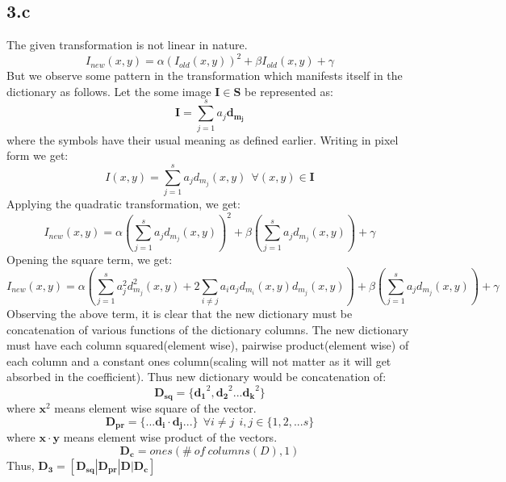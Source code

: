 \documentclass[12pt]{article}
\begin{document}
\subsection*{3.c}
The given transformation is not linear in nature.
\begin{equation*}
    I_{new}(x,y) = \alpha(I_{old}(x,y))^2+\beta I_{old}(x,y)+\gamma
\end{equation*}
But we observe some pattern in the transformation which manifests itself in the dictionary as follows. Let the some image $\boldsymbol{I}\in \boldsymbol{S}$ be represented as:
\begin{equation*}
    \boldsymbol{I} = \sum_{j=1}^{s} a_j\boldsymbol{d_{m_j}}  
\end{equation*}
where the symbols have their usual meaning as defined earlier. Writing in pixel form we get:
\begin{equation*}
    I(x,y) = \sum_{j=1}^{s} a_jd_{m_j}(x,y) \ \ \forall (x,y) \in \boldsymbol{I}
\end{equation*}
Applying the quadratic transformation, we get:
\begin{equation*}
    I_{new}(x,y) = \alpha(\sum_{j=1}^{s} a_jd_{m_j}(x,y))^2+\beta(\sum_{j=1}^{s} a_jd_{m_j}(x,y))+\gamma 
\end{equation*}
Opening the square term, we get:
\begin{equation*}
    I_{new}(x,y) = \alpha(\sum_{j=1}^{s} a_j^2d_{m_j}^2(x,y)+2\sum_{i\not= j}a_ia_jd_{m_i}(x,y)d_{m_j}(x,y))+\beta(\sum_{j=1}^{s} a_jd_{m_j}(x,y))+\gamma 
\end{equation*}
Observing the above term, it is clear that the new dictionary must be concatenation of various functions of the dictionary columns. The new dictionary must have each column squared(element wise), pairwise product(element wise) of each column and a constant ones column(scaling will not matter as it will get absorbed in the coefficient). Thus new dictionary would be concatenation of:
\begin{equation*}
    \boldsymbol{D_{sq}} = \{\boldsymbol{d_1}^2, \boldsymbol{d_2}^2... \boldsymbol{d_k}^2\}
\end{equation*}
where $\boldsymbol{x}^2$ means element wise square of the vector. 
\begin{equation*}
    \boldsymbol{D_{pr}} = \{...\boldsymbol{d_i}\cdot\boldsymbol{d_j}...\} \ \ \forall i\not=j \ \ i,j\in \{1, 2, ... s\}
\end{equation*}
where $\boldsymbol{x\cdot y}$ means element wise product of the vectors.
\begin{equation*}
    \boldsymbol{D_c} = ones(\# \ of \ columns(D), 1)
\end{equation*}
Thus, $\boldsymbol{D_3} = [\boldsymbol{D_{sq}}| \boldsymbol{D_{pr}}| \boldsymbol{D}| \boldsymbol{D_c}]$
\end{document}
